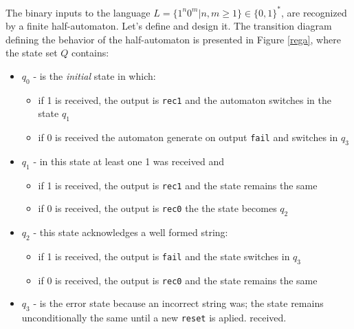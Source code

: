 \begin{exemplu}\label{regLang}
The binary inputs to the language $L = \{1^{n}0^{m} | n,m \geq 1\} \in \{0,1\}^*$,
are recognized by a finite half-automaton.
Let's define and design it. The transition diagram defining the
behavior of the half-automaton is presented in Figure \ref{rega},
where the state set $Q$ contains:
\begin{itemize}
    \item $q_{0}$ - is the {\em initial} state in which:
        \begin{itemize}
            \item if 1 is received, the output is {\tt rec1} and the automaton switches in the state $q_{1}$
            \item if 0 is received the automaton generate on output {\tt fail} and switches in $q_{3}$
        \end{itemize}
    \item $q_{1}$ - in this state at least one 1 was received and
        \begin{itemize}
            \item if 1 is received, the output is {\tt rec1} and the state remains the same
            \item if 0 is received, the output is {\tt rec0} the the state becomes $q_{2}$
        \end{itemize}

        
    \item $q_{2}$ - this state acknowledges a well formed string:
        \begin{itemize}
            \item if 1 is received, the output is {\tt fail} and the state switches in $q_{3}$
            \item if 0 is received, the output is {\tt rec0} and the state remains the same
        \end{itemize}
    \item $q_{3}$ - is the  error state because  an incorrect string was; the state remains unconditionally the same until a new {\tt reset} is aplied.
    received.
\end{itemize}




\end{exemplu}

